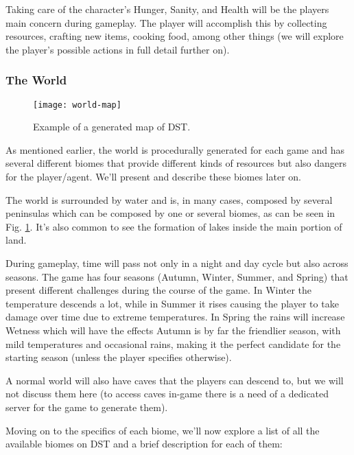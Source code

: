 Taking care of the character's Hunger, Sanity, and Health will be the players main concern during gameplay.
The player will accomplish this by collecting resources, crafting new items, cooking food, among other things (we will explore the player's possible actions in full detail further on).

\subsubsection{The World}

\begin{figure}
  \centering
    \texttt{[image: world-map]}
  \caption{Example of a generated map of \ac{DST}.}
  \label{fig:world-map}
\end{figure}
As mentioned earlier, the world is procedurally generated for each game and has several different biomes that provide different kinds of resources but also dangers for the player/agent. 
We'll present and describe these biomes later on.

The world is surrounded by water and is, in many cases, composed by several peninsulas which can be composed by one or several biomes, as can be seen in Fig. \ref{fig:world-map}.
It's also common to see the formation of lakes inside the main portion of land.

During gameplay, time will pass not only in a night and day cycle but also across seasons.
The game has four seasons (Autumn, Winter, Summer, and Spring) that present different challenges during the course of the game.
In Winter the temperature descends a lot, while in Summer it rises causing the player to take damage over time due to extreme temperatures.
In Spring the rains will increase Wetness which will have the effects 
Autumn is by far the friendlier season, with mild temperatures and occasional rains, making it the perfect candidate for the starting season (unless the player specifies otherwise).

A normal world will also have caves that the players can descend to, but we will not discuss them here (to access caves in-game there is a need of a dedicated server for the game to generate them).

Moving on to the specifics of each biome, we'll now explore a list of all the available biomes on \ac{DST} and a brief description for each of them:

